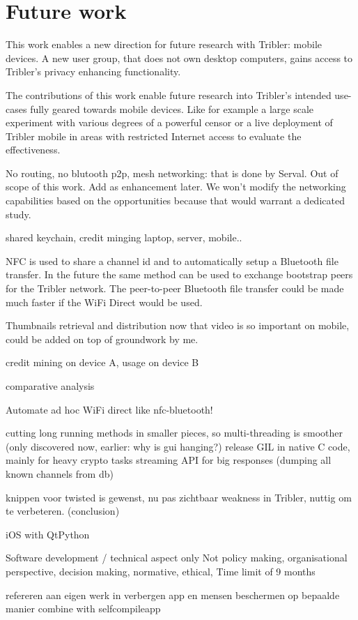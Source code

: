 \section{Future work}
\label{ch:future_work}

This work enables a new direction for future research with Tribler: mobile devices.
A new user group, that does not own desktop computers, gains access to Tribler's privacy enhancing functionality.

The contributions of this work enable future research into Tribler's intended use-cases fully geared towards mobile devices.
Like for example a large scale experiment with various degrees of a powerful censor or a live deployment of Tribler mobile in areas with restricted Internet access to evaluate the effectiveness.



No routing, no blutooth p2p, mesh networking: that is done by Serval. Out of scope of this work. Add as enhancement later.
We won't modify the networking capabilities based on the opportunities because that would warrant a dedicated study.



shared keychain, credit minging laptop, server, mobile..


NFC is used to share a channel id and to automatically setup a Bluetooth file transfer.
In the future the same method can be used to exchange bootstrap peers for the Tribler network.
The peer-to-peer Bluetooth file transfer could be made much faster if the WiFi Direct would be used.


Thumbnails retrieval and distribution now that video is so important on mobile, could be added on top of groundwork by me.


credit mining on device A, usage on device B


comparative analysis

Automate ad hoc WiFi direct like nfc-bluetooth!

cutting long running methods in smaller pieces, so multi-threading is smoother (only discovered now, earlier: why is gui hanging?)
release GIL in native C code, mainly for heavy crypto tasks
streaming API for big responses (dumping all known channels from db)

knippen voor twisted is gewenst, nu pas zichtbaar weakness in Tribler, nuttig om te verbeteren. (conclusion)


iOS with QtPython


Software development / technical aspect only
Not policy making, organisational perspective, decision making, normative, ethical,
Time limit of 9 months


refereren aan eigen werk in verbergen app en mensen beschermen op bepaalde manier
combine with selfcompileapp
